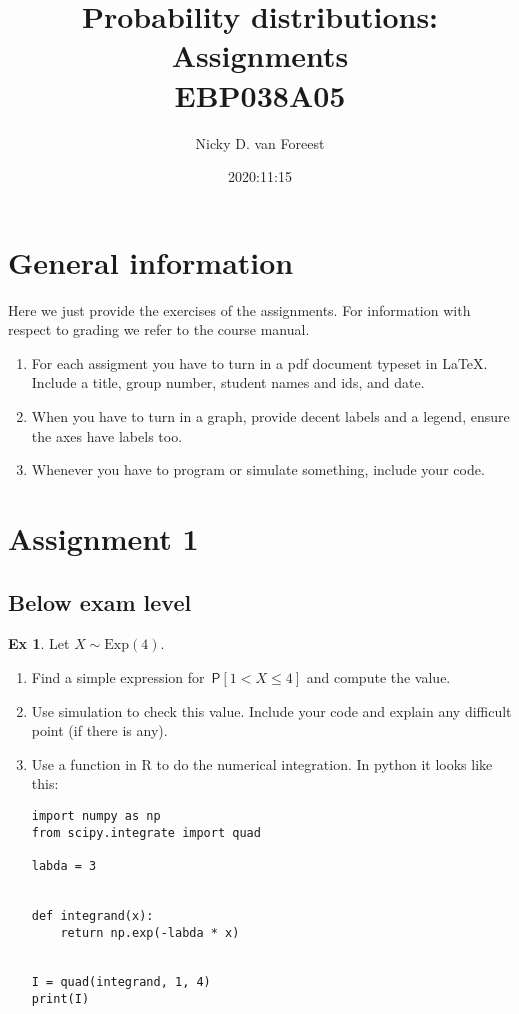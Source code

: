 \documentclass[a4paper]{article}
\author{Nicky D. van Foreest}
\date{2020:11:15}
\title{Probability distributions: Assignments\\\medskip
\large EBP038A05}
\theoremstyle{definition}
\newtheorem{exercise}{Ex}[section]
\newcommand{\Exp}[1]{\mathrm{Exp}(#1)}
\renewcommand{\P}[1]{\,\mathsf{P}\left[#1\right]}
\newcommand{\1}[1]{\,I_{#1}} %
\begin{document}
\maketitle


\section*{General information}
\label{sec:orgb865fed}

Here we just provide the exercises of the assignments.  For information with respect to grading we refer to the  course manual.

\begin{enumerate}
\item For each assigment you have to turn in a pdf document typeset in \LaTeX{}. Include a title, group number, student names and ids, and date.
\item When you have to turn in a graph, provide decent labels and a legend, ensure the axes have labels too.
\item Whenever you have to program or simulate something, include your code. 
\end{enumerate}

\section{Assignment 1}
\label{sec:org9cbca82}

\subsection{Below exam level}
\label{sec:below-exam-level}


\begin{exercise}
Let $X\sim\Exp{4}$. 
\begin{enumerate}
\item Find a simple expression for $\P{1 < X  \leq 4}$ and compute the value.  
\item Use simulation to check this value. Include your code and explain any difficult point (if there is any). 
\item Use a function in R to do the numerical integration.  In python it looks like this:
\begin{verbatim}
import numpy as np
from scipy.integrate import quad

labda = 3


def integrand(x):
    return np.exp(-labda * x)


I = quad(integrand, 1, 4)
print(I)
\end{verbatim}
  
\end{enumerate}
\end{exercise}
\end{document}
